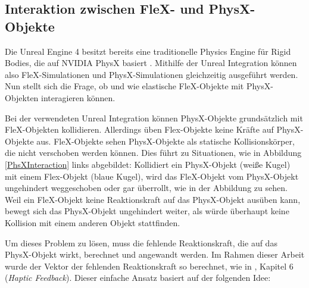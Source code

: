 
  
\subsection{Interaktion zwischen FleX- und PhysX-Objekte}
\label{subsec_physXFleX}

 
Die Unreal Engine 4 besitzt bereits eine traditionelle Physics Engine für Rigid Bodies, die auf NVIDIA PhysX basiert \cite{ue4physics}. Mithilfe der Unreal Integration können also  FleX-Simulationen und PhysX-Simulationen gleichzeitig ausgeführt werden. Nun stellt sich die Frage, ob und wie elastische  FleX-Objekte mit PhysX-Objekten interagieren können.

Bei der verwendeten Unreal Integration können PhysX-Objekte grundsätzlich mit FleX-Objekten kollidieren. Allerdings üben Flex-Objekte keine Kräfte auf PhysX-Objekte aus. FleX-Objekte sehen PhysX-Objekte als statische Kollisionskörper, die nicht verschoben werden können. Dies führt zu Situationen, wie in Abbildung \ref{PhsXInteraction} links abgebildet: Kollidiert ein PhysX-Objekt (weiße Kugel) mit einem Flex-Objekt (blaue Kugel), wird das FleX-Objekt vom PhysX-Objekt ungehindert weggeschoben oder gar überrollt, wie in der Abbildung zu sehen. Weil ein FleX-Objekt keine Reaktionskraft auf das PhysX-Objekt ausüben kann, bewegt sich das PhysX-Objekt ungehindert weiter, als würde überhaupt keine Kollision mit einem anderen Objekt stattfinden.


Um dieses Problem zu lösen, muss die fehlende Reaktionskraft, die auf das PhysX-Objekt wirkt, berechnet und angewandt werden. 
Im Rahmen dieser Arbeit wurde der Vektor der fehlenden Reaktionskraft so berechnet, wie in \cite{VRSim20}, Kapitel 6 (\textit{Haptic Feedback}). Dieser einfache Ansatz basiert auf der folgenden Idee: 

